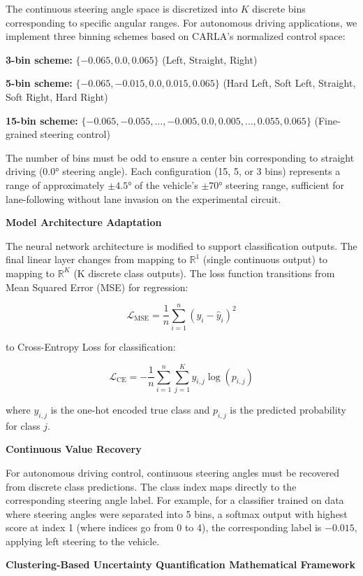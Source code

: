 The continuous steering angle space is discretized into $K$ discrete bins corresponding to specific angular ranges. For autonomous driving applications, we implement three binning schemes based on CARLA's normalized control space:

\textbf{3-bin scheme:} $\{-0.065, 0.0, 0.065\}$ (Left, Straight, Right)

\textbf{5-bin scheme:} $\{-0.065, -0.015, 0.0, 0.015, 0.065\}$ (Hard Left, Soft Left, Straight, Soft Right, Hard Right)

\textbf{15-bin scheme:} $\{-0.065, -0.055, \ldots, -0.005, 0.0, 0.005, \ldots, 0.055, 0.065\}$ (Fine-grained steering control)

The number of bins must be odd to ensure a center bin corresponding to straight driving ($0.0°$ steering angle). Each configuration (15, 5, or 3 bins) represents a range of approximately $\pm 4.5°$ of the vehicle's $\pm 70°$ steering range, sufficient for lane-following without lane invasion on the experimental circuit.

\textbf{Model Architecture Adaptation}

The neural network architecture is modified to support classification outputs. The final linear layer changes from mapping to $\mathbb{R}^1$ (single continuous output) to mapping to $\mathbb{R}^K$ (K discrete class outputs). The loss function transitions from Mean Squared Error (MSE) for regression:

$$\mathcal{L}_{\text{MSE}} = \frac{1}{n} \sum_{i=1}^{n} (y_i - \hat{y}_i)^2$$

to Cross-Entropy Loss for classification:

$$\mathcal{L}_{\text{CE}} = -\frac{1}{n} \sum_{i=1}^{n} \sum_{j=1}^{K} y_{i,j} \log(p_{i,j})$$

where $y_{i,j}$ is the one-hot encoded true class and $p_{i,j}$ is the predicted probability for class $j$.

\textbf{Continuous Value Recovery}

For autonomous driving control, continuous steering angles must be recovered from discrete class predictions. The class index maps directly to the corresponding steering angle label. For example, for a classifier trained on data where steering angles were separated into 5 bins, a softmax output with highest score at index 1 (where indices go from 0 to 4), the corresponding label is $-0.015$, applying left steering to the vehicle.

\textbf{Clustering-Based Uncertainty Quantification Mathematical Framework}

